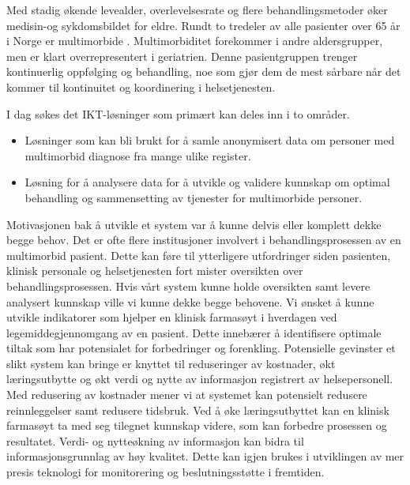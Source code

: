  Med stadig økende levealder, overlevelsesrate og flere behandlingsmetoder øker medisin-og sykdomsbildet for eldre.  Rundt to tredeler av alle pasienter over 65 år i Norge er multimorbide \citep{multimorbidity_trend}. Multimorbiditet forekommer i andre aldersgrupper, men er klart overrepresentert i geriatrien. Denne pasientgruppen trenger kontinuerlig oppfølging og behandling, noe som gjør dem de mest sårbare når det kommer til kontinuitet og koordinering i helsetjenesten.

I dag søkes det IKT-løsninger som primært kan deles inn i to områder. \citep{innovathon_helsit} 
\begin{itemize}
    \item Løsninger som kan bli brukt for å samle anonymisert data om personer med multimorbid diagnose fra mange ulike register.
    \item Løsning for å analysere data for å utvikle og validere kunnskap om optimal behandling og sammensetting av tjenester for multimorbide personer.
\end{itemize}
Motivasjonen bak å utvikle et system var å kunne delvis eller komplett dekke begge behov. Det er ofte flere institusjoner involvert i behandlingsprosessen av en multimorbid pasient. Dette kan føre til ytterligere utfordringer siden pasienten, klinisk personale og helsetjenesten fort mister oversikten over behandlingsprosessen. Hvis vårt system kunne holde oversikten samt levere analysert kunnskap ville vi kunne dekke begge behovene. Vi ønsket å kunne utvikle indikatorer som hjelper en klinisk farmasøyt i hverdagen ved legemiddegjennomgang av en pasient. Dette innebærer å identifisere optimale tiltak som har potensialet for forbedringer og forenkling. Potensielle gevinster et slikt system kan bringe er knyttet til reduseringer av kostnader, økt læringsutbytte og økt verdi og nytte av informasjon registrert av helsepersonell. Med redusering av kostnader mener vi at systemet kan potensielt redusere reinnleggelser samt redusere tidsbruk. Ved å øke læringsutbyttet kan en klinisk farmasøyt ta med seg tilegnet kunnskap videre, som kan forbedre prosessen og resultatet. Verdi- og nytteøkning av informasjon kan bidra til informasjonsgrunnlag av høy kvalitet. Dette  kan igjen brukes i utviklingen av mer presis teknologi for monitorering og beslutningsstøtte i fremtiden.

